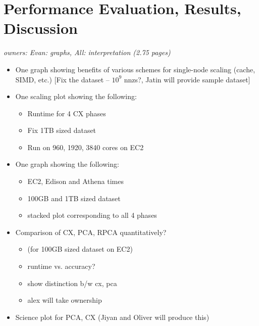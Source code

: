 \section{Performance Evaluation, Results, Discussion}
\textit{owners: Evan: graphs, All: interpretation (2.75 pages)}
\begin{itemize}
  \item One graph showing benefits of various schemes for single-node scaling (cache, SIMD, etc.) [Fix the dataset -- $10^9$ nnzs?, Jatin will provide sample dataset]
  \item One scaling plot showing the following:
  \begin{itemize}
    \item Runtime for 4 CX phases
    \item Fix 1TB sized dataset
    \item Run on 960, 1920, 3840 cores on EC2  
  \end{itemize}

  \item One graph showing the following:
  \begin{itemize}
    \item EC2, Edison and Athena times
    \item 100GB and 1TB sized dataset
    \item stacked plot corresponding to all 4 phases
  \end{itemize}

 \item Comparison of CX, PCA, RPCA quantitatively? 
  \begin{itemize}
    \item (for 100GB sized dataset on EC2)
    \item runtime vs. accuracy?
    \item show distinction b/w cx, pca
    \item alex will take ownership
  \end{itemize}

 \item Science plot for PCA, CX (Jiyan and Oliver will produce this)
\end{itemize}
